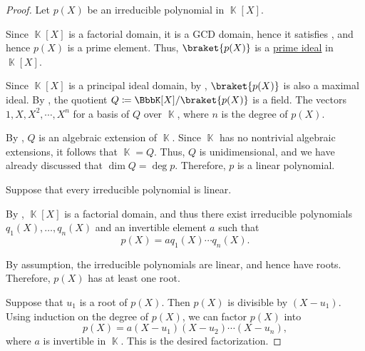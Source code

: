 \begin{proof}
   Let \( p(X) \) be an irreducible polynomial in \( \BbbK[X] \).

  Since \( \BbbK[X] \) is a factorial domain, it is a GCD domain, hence it satisfies , and hence \( p(X) \) is a prime element. Thus, \( \braket {p(X)} \) is a \hyperref[def:semiring_ideal/prime]{prime ideal} in \( \BbbK[X] \).

  Since \( \BbbK[X] \) is a principal ideal domain, by , \( \braket{ p(X) } \) is also a maximal ideal. By , the quotient \( Q \coloneqq \BbbK[X] / \braket{ p(X) } \) is a field. The vectors \( 1, X, X^2, \cdots, X^n \) for a basis of \( Q \) over \( \BbbK \), where \( n \) is the degree of \( p(X) \).

  By , \( Q \) is an algebraic extension of \( \BbbK \). Since \( \BbbK \) has no nontrivial algebraic extensions, it follows that \( \BbbK = Q \). Thus, \( Q \) is unidimensional, and we have already discussed that \( \dim Q = \deg p \). Therefore, \( p \) is a linear polynomial.

   Suppose that every irreducible polynomial is linear.

  By , \( \BbbK[X] \) is a factorial domain, and thus there exist irreducible polynomials \( q_1(X), \ldots, q_n(X) \) and an invertible element \( a \) such that
  \begin{equation*}
    p(X) = a q_1(X) \cdots q_n(X).
  \end{equation*}

  By assumption, the irreducible polynomials are linear, and hence have roots. Therefore, \( p(X) \) has at least one root.

   Suppose that \( u_1 \) is a root of \( p(X) \). Then \( p(X) \) is divisible by \( (X - u_1) \). Using induction on the degree of \( p(X) \), we can factor \( p(X) \) into
  \begin{equation*}
    p(X) = a (X - u_1) (X - u_2) \cdots (X - u_n),
  \end{equation*}
  where \( a \) is invertible in \( \BbbK \). This is the desired factorization.


\end{proof}
